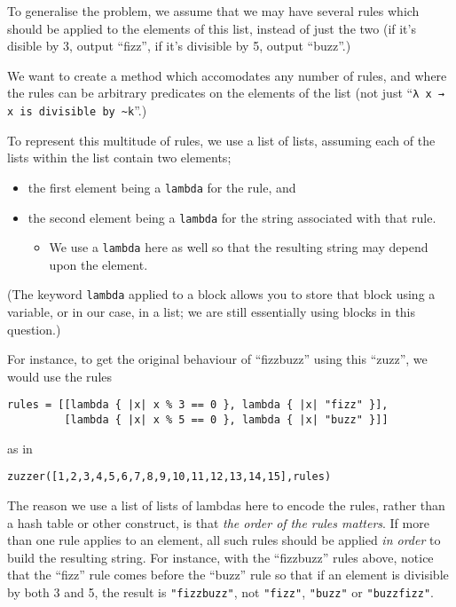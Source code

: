 \documentclass[11pt]{article}
\begin{document}
To generalise the problem, we assume that we may have
several rules which should be applied to the elements of this list,
instead of just the two (if it's disible by 3, output “fizz”,
if it's divisible by 5, output “buzz”.)

We want to create a method which accomodates any number of rules,
and where the rules can be arbitrary predicates
on the elements of the list
(not just “\texttt{λ x → x is divisible by \textasciitilde{}k}”.)

To represent this multitude of rules, we use a list of lists,
assuming each of the lists within the list contain two elements;
\begin{itemize}
\item the first element being a \texttt{lambda} for the rule, and
\item the second element being a \texttt{lambda} for the string
associated with that rule.
\begin{itemize}
\item We use a \texttt{lambda} here as well so that the resulting string
may depend upon the element.
\end{itemize}
\end{itemize}

(The keyword \texttt{lambda} applied to a block allows you to store
that block using a variable, or in our case, in a list;
we are still essentially using blocks in this question.)

For instance, to get the original behaviour of “fizzbuzz”
using this “zuzz”, we would use the rules
\begin{verbatim}
rules = [[lambda { |x| x % 3 == 0 }, lambda { |x| "fizz" }],
         [lambda { |x| x % 5 == 0 }, lambda { |x| "buzz" }]]
\end{verbatim}
as in
\begin{verbatim}
zuzzer([1,2,3,4,5,6,7,8,9,10,11,12,13,14,15],rules)
\end{verbatim}

The reason we use a list of lists of lambdas here to encode the rules,
rather than a hash table or other construct,
is that \emph{the order of the rules matters}.
If more than one rule applies to an element, all such rules
should be applied \emph{in order} to build the resulting string.
For instance, with the “fizzbuzz” rules above, notice
that the “fizz” rule comes before the “buzz” rule
so that if an element is divisible by both 3 and 5,
the result is \texttt{"fizzbuzz"}, not \texttt{"fizz"}, \texttt{"buzz"} or \texttt{"buzzfizz"}.
\end{document}
